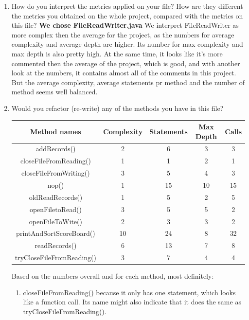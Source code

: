 \documentclass{article}
\begin{document}
\begin{enumerate}
\item
How do you interpret the metrics applied on your file? How are they different the metrics you
obtained on the whole project, compared with the metrics on this file?\newline
\textbf{We chose FileReadWriter.java}\newline
We interpret FileReadWriter as more complex then the average for the project, as the 
numbers for average complexity and average depth are higher. Its number for max complexity and
max depth is also pretty high. At the same time, it looks like it's more commented then
the average of the project, which is good, and with another look at the numbers, it contains 
almost all of the comments in this project. But the average complexity, average statements
pr method and the number of method seems well balanced.

\item
Would	you	refactor	(re-write)	any	of	the	methods you	have	in	this	file?	

\begin{tabulary}{0.5\textwidth}{| c | c | c | c | c |}
 \hline
\textbf{Method names} &	\textbf{Complexity} & \textbf{Statements} & \textbf{Max Depth} & \textbf{Calls} \\ \hline

addRecords()				& 2 & 6 & 3 & 3 \\ \hline
closeFileFromReading() 		& 1 & 1 & 2 & 1 \\ \hline
closeFileFromWriting() 		& 3 & 5 & 4 & 3 \\ \hline
nop() 				  		& 1 & 15 & 10 & 15 \\ \hline
oldReadRecords()		  	& 1 & 5 & 2 & 5 \\ \hline
openFiletoRead()			& 3 & 5 & 5 & 2 \\ \hline
openFileToWite()			& 2 & 3 & 3 & 2 \\ \hline
printAndSortScoreBoard()	& 10 & 24 & 8 & 32 \\ \hline
readRecords()				& 6 & 13 & 7 & 8 \\ \hline
tryCloseFileFromReading()	& 3 & 7 & 4 & 4 \\ \hline
\end{tabulary}

Based on the numbers overall and for each method, most definitely:
\begin{enumerate}
\item
closeFileFromReading() because it only has one statement, which looks like a function call.
Its name might also indicate that it does the same as tryCloseFileFromReading().


\end{enumerate}
\end{enumerate}
\end{document}
